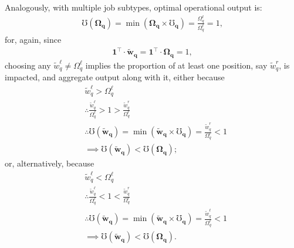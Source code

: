 \documentclass[hidelinks, nonatbib]{elsarticle}
\begin{document}
Analogously, with multiple job subtypes, optimal operational output is:
\begin{gather}
    \mho(\boldsymbol{\Omega_q})
    = 
    \min(
        \boldsymbol{\Omega_q}
        \times
        \boldsymbol{\mho_q}
    )
    =
    \frac{
        \Omega_{q}^{\ell}
    }{
        \Omega_{q}^{\ell}
    }
    =
    1
    ,
\end{gather}
for, again, since
\begin{gather}
    \boldsymbol{1} ^ {\top}
    \cdot
    \boldsymbol{\tilde{w}_{q}}
    =
    \boldsymbol{1} ^ {\top}
    \cdot
    \boldsymbol{\Omega_{q}}
    = 1
    ,
\end{gather}
choosing any $\tilde{w}_{q}^{\ell} \neq \Omega_{q}^{\ell}$ implies the proportion of at least one position, say $\tilde{w}_{q}^{r}$, is impacted, and aggregate output along with it, either because
\begin{align}
    &
    \tilde{w}_{q}^{\ell} > \Omega_{q}^{\ell}
    \\
    &\therefore
    \frac{
        \tilde{w}_{q}^{\ell}
    }{
        \Omega_{q}^{\ell}
    }
    > 
    1
    > 
    \frac{
        \tilde{w}_{q}^{r}
    }{
        \Omega_{q}^{r}
    }
    \\
    &\therefore
    \mho(\boldsymbol{\tilde{w}_q})
    = 
    \min(
        \boldsymbol{\tilde{w}_q}
        \times
        \boldsymbol{\mho_q}
    )
    =
    \frac{
        \tilde{w}_{q}^{r}
    }{
        \Omega_{q}^{r}
    }
    < 
    1
    \\
    &\implies
    \mho(\boldsymbol{\tilde{w}_q})
    <
    \mho(\boldsymbol{\Omega_q})
    ;
\end{align}
or, alternatively, because
\begin{align}
    &
    \tilde{w}_{q}^{\ell} < \Omega_{q}^{\ell}
    \\
    &\therefore
    \frac{
        \tilde{w}_{q}^{\ell}
    }{
        \Omega_{q}^{\ell}
    }
    < 
    1
    < 
    \frac{
        \tilde{w}_{q}^{r}
    }{
        \Omega_{q}^{r}
    }
    \\
    &\therefore
    \mho(\boldsymbol{\tilde{w}_q})
    = 
    \min(
        \boldsymbol{\tilde{w}_q}
        \times
        \boldsymbol{\mho_q}
    )
    =
    \frac{
        \tilde{w}_{q}^{\ell}
    }{
        \Omega_{q}^{\ell}
    }
    < 
    1
    \\
    &\implies
    \mho(\boldsymbol{\tilde{w}_q})
    <
    \mho(\boldsymbol{\Omega_q})
    .
\end{align}
\end{document}
